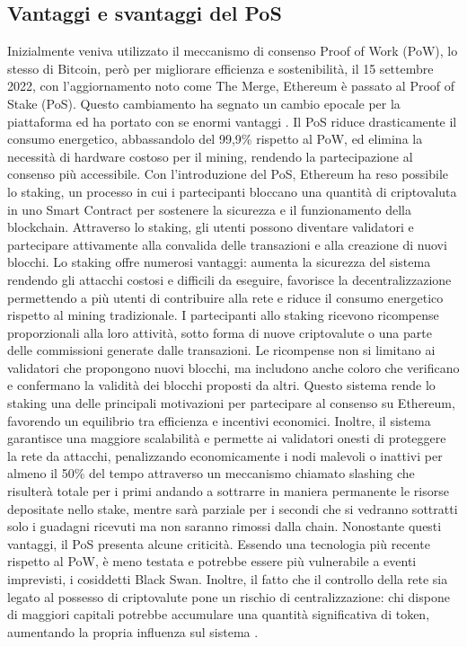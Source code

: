 \subsection{Vantaggi e svantaggi del PoS}
Inizialmente veniva utilizzato il meccanismo di consenso Proof of Work (PoW), lo stesso di Bitcoin, però per migliorare efficienza e sostenibilità, il 15 settembre 2022, con l’aggiornamento noto come The Merge, Ethereum è passato al Proof of Stake (PoS). 
Questo cambiamento ha segnato un cambio epocale per la piattaforma ed ha portato con se enormi vantaggi \cite{crypto_gateway_video}.
Il PoS riduce drasticamente il consumo energetico, abbassandolo del 99,9\% rispetto al PoW, ed elimina la necessità di hardware costoso per il mining, rendendo la partecipazione al consenso più accessibile.
Con l’introduzione del PoS, Ethereum ha reso possibile lo staking, un processo in cui i partecipanti bloccano una quantità di criptovaluta in uno Smart Contract per sostenere la sicurezza e il funzionamento della blockchain. Attraverso lo staking, gli utenti possono diventare validatori e partecipare attivamente alla convalida delle transazioni e alla creazione di nuovi blocchi.
Lo staking offre numerosi vantaggi: aumenta la sicurezza del sistema rendendo gli attacchi costosi e difficili da eseguire, favorisce la decentralizzazione permettendo a più utenti di contribuire alla rete e riduce il consumo energetico rispetto al mining tradizionale. I partecipanti allo staking ricevono ricompense proporzionali alla loro attività, sotto forma di nuove criptovalute o una parte delle commissioni generate dalle transazioni.
Le ricompense non si limitano ai validatori che propongono nuovi blocchi, ma includono anche coloro che verificano e confermano la validità dei blocchi proposti da altri. Questo sistema rende lo staking una delle principali motivazioni per partecipare al consenso su Ethereum, favorendo un equilibrio tra efficienza e incentivi economici.
Inoltre, il sistema garantisce una maggiore scalabilità e permette ai validatori onesti di proteggere la rete da attacchi, penalizzando economicamente i nodi malevoli o inattivi per almeno il 50\% del tempo attraverso un meccanismo chiamato slashing che risulterà totale per i primi andando a sottrarre in maniera permanente le risorse depositate nello stake, mentre sarà parziale per i secondi che si vedranno sottratti solo i guadagni ricevuti ma non saranno rimossi dalla chain.
Nonostante questi vantaggi, il PoS presenta alcune criticità. Essendo una tecnologia più recente rispetto al PoW, è meno testata e potrebbe essere più vulnerabile a eventi imprevisti, i cosiddetti Black Swan. Inoltre, il fatto che il controllo della rete sia legato al possesso di criptovalute pone un rischio di centralizzazione: chi dispone di maggiori capitali potrebbe accumulare una quantità significativa di token, aumentando la propria influenza sul sistema \cite{kraken_docsend}.
